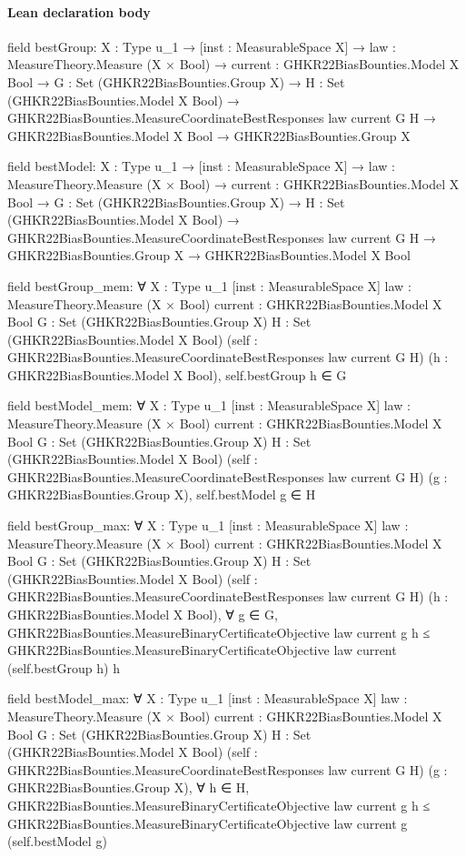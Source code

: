 \documentclass[10pt]{article}
\begin{document}
\paragraph{Lean declaration body}
\begin{ReviewVerbatim}
field bestGroup:
{X : Type u_1} →
  [inst : MeasurableSpace X] →
    {law : MeasureTheory.Measure (X × Bool)} →
      {current : GHKR22BiasBounties.Model X Bool} →
        {G : Set (GHKR22BiasBounties.Group X)} →
          {H : Set (GHKR22BiasBounties.Model X Bool)} →
            GHKR22BiasBounties.MeasureCoordinateBestResponses law current G H →
              GHKR22BiasBounties.Model X Bool → GHKR22BiasBounties.Group X

field bestModel:
{X : Type u_1} →
  [inst : MeasurableSpace X] →
    {law : MeasureTheory.Measure (X × Bool)} →
      {current : GHKR22BiasBounties.Model X Bool} →
        {G : Set (GHKR22BiasBounties.Group X)} →
          {H : Set (GHKR22BiasBounties.Model X Bool)} →
            GHKR22BiasBounties.MeasureCoordinateBestResponses law current G H →
              GHKR22BiasBounties.Group X → GHKR22BiasBounties.Model X Bool

field bestGroup_mem:
∀ {X : Type u_1} [inst : MeasurableSpace X] {law : MeasureTheory.Measure (X × Bool)}
  {current : GHKR22BiasBounties.Model X Bool} {G : Set (GHKR22BiasBounties.Group X)}
  {H : Set (GHKR22BiasBounties.Model X Bool)} (self : GHKR22BiasBounties.MeasureCoordinateBestResponses law current G H)
  (h : GHKR22BiasBounties.Model X Bool), self.bestGroup h ∈ G

field bestModel_mem:
∀ {X : Type u_1} [inst : MeasurableSpace X] {law : MeasureTheory.Measure (X × Bool)}
  {current : GHKR22BiasBounties.Model X Bool} {G : Set (GHKR22BiasBounties.Group X)}
  {H : Set (GHKR22BiasBounties.Model X Bool)} (self : GHKR22BiasBounties.MeasureCoordinateBestResponses law current G H)
  (g : GHKR22BiasBounties.Group X), self.bestModel g ∈ H

field bestGroup_max:
∀ {X : Type u_1} [inst : MeasurableSpace X] {law : MeasureTheory.Measure (X × Bool)}
  {current : GHKR22BiasBounties.Model X Bool} {G : Set (GHKR22BiasBounties.Group X)}
  {H : Set (GHKR22BiasBounties.Model X Bool)} (self : GHKR22BiasBounties.MeasureCoordinateBestResponses law current G H)
  (h : GHKR22BiasBounties.Model X Bool),
  ∀ g ∈ G,
    GHKR22BiasBounties.MeasureBinaryCertificateObjective law current g h ≤
      GHKR22BiasBounties.MeasureBinaryCertificateObjective law current (self.bestGroup h) h

field bestModel_max:
∀ {X : Type u_1} [inst : MeasurableSpace X] {law : MeasureTheory.Measure (X × Bool)}
  {current : GHKR22BiasBounties.Model X Bool} {G : Set (GHKR22BiasBounties.Group X)}
  {H : Set (GHKR22BiasBounties.Model X Bool)} (self : GHKR22BiasBounties.MeasureCoordinateBestResponses law current G H)
  (g : GHKR22BiasBounties.Group X),
  ∀ h ∈ H,
    GHKR22BiasBounties.MeasureBinaryCertificateObjective law current g h ≤
      GHKR22BiasBounties.MeasureBinaryCertificateObjective law current g (self.bestModel g)
\end{ReviewVerbatim}
\end{document}
